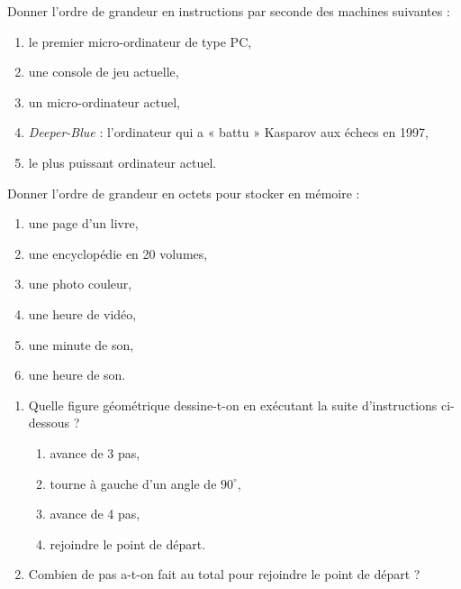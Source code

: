 \begin{td}\label{td:mips}
Donner l'ordre de grandeur en instructions par seconde des machines suivantes :
\begin{enumerate}
\item le premier micro-ordinateur de type PC,
\item une console de jeu actuelle,
\item un micro-ordinateur actuel,
\item {\em Deeper-Blue} : l'ordinateur qui a « battu » Kasparov aux échecs en 1997,
\item le plus puissant ordinateur actuel.
\end{enumerate}
\end{td}

\begin{td}\label{td:stock}
Donner l'ordre de grandeur en octets pour stocker en mémoire :
\begin{enumerate}
\item une page d'un livre,
\item une encyclopédie en 20 volumes,
\item une photo couleur,
\item une heure de vidéo,
\item une minute de son,
\item une heure de son.
\end{enumerate}
\end{td}

\begin{td}\label{td:plage3}
\begin{enumerate}
\item Quelle figure géométrique dessine-t-on en exécutant la suite d'instructions 
ci-dessous ?
	\begin{enumerate}
	\item avance de 3 pas,
	\item tourne à gauche d'un angle de $90^\circ$,
	\item avance de 4 pas,
	\item rejoindre le point de départ.
	\end{enumerate}
\item Combien de pas a-t-on fait au total pour rejoindre le point de départ ?
\end{enumerate}
\end{td}

